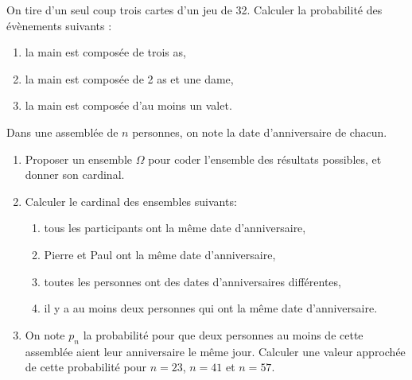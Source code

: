 \begin{exo}
On tire d'un seul coup trois cartes d'un jeu de 32. Calculer la probabilit\'e des \'ev\`enements suivants : 
\begin{enumerate}
\item la main est compos\'ee de trois as, 
\item la main est compos\'ee de 2 as et une dame, 
\item la main est compos\'ee d'au moins un valet.
\end{enumerate}
\end{exo}


\begin{exo}
Dans une assembl\'ee de $n$ personnes, on note la date d'anniversaire de chacun.
\begin{enumerate}
\item Proposer un ensemble $\Omega$ pour coder l'ensemble des r\'esultats possibles, et donner son cardinal.
\item Calculer le cardinal des ensembles suivants:
\begin{enumerate}
\item tous les participants ont la m\^eme date d'anniversaire,
\item Pierre et Paul ont la m\^eme date d'anniversaire,
\item toutes les personnes ont des dates d'anniversaires diff\'erentes,
\item il y a au moins deux personnes qui ont la m\^eme date d'anniversaire.
\end{enumerate}
\item On note $p_n$ la probabilit\'e pour que deux personnes au moins de cette assembl\'ee aient 
leur anniversaire le m\^eme jour. Calculer une valeur approch\'ee de cette probabilit\'e pour $n=23$, $n=41$ et $n=57$.
\end{enumerate}
\end{exo}

